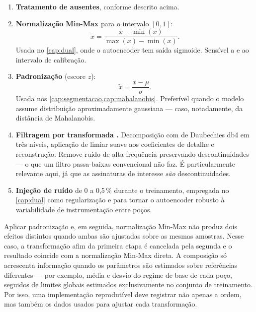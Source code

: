 \begin{enumerate}[leftmargin=*,itemsep=0.45em]

\item \textbf{Tratamento de ausentes}, conforme descrito acima.

\item \textbf{Normalização Min-Max} para o intervalo $[0,1]$:
\[
  \tilde{x} = \frac{x - \min(x)}{\max(x) - \min(x)}.
\]
Usada no \cref{cap:dual}, onde o autoencoder tem saída sigmoide. Sensível a
 e ao intervalo de calibração.

\item \textbf{Padronização} (escore $z$):
\[
  \tilde{x} = \frac{x - \mu}{\sigma}.
\]
Usada nos \cref{cap:segmentacao,cap:mahalanobis}. Preferível quando o modelo assume
distribuição aproximadamente gaussiana --- caso, notadamente, da distância de
Mahalanobis.

\item \textbf{Filtragem por transformada .} Decomposição com 
de Daubechies db4 em três níveis, aplicação de limiar suave aos coeficientes de detalhe
e reconstrução. Remove ruído de alta frequência preservando descontinuidades --- o que
um filtro passa-baixas convencional não faz. É particularmente relevante aqui, já que
as assinaturas de interesse \emph{são} descontinuidades.

\item \textbf{Injeção de ruído} de 0 a 0,5\,\% durante o treinamento, empregada no
\cref{cap:dual} como regularização e para tornar o autoencoder robusto à variabilidade
de instrumentação entre poços.

\end{enumerate}

\begin{destaque}
Aplicar padronização e, em seguida, normalização Min-Max não produz dois efeitos
distintos quando ambas são ajustadas sobre as mesmas amostras. Nesse caso, a
transformação afim da primeira etapa é cancelada pela segunda e o resultado coincide
com a normalização Min-Max direta. A composição só acrescenta informação quando os
parâmetros são estimados sobre referências diferentes --- por exemplo, média e desvio
do regime de base de cada poço, seguidos de limites globais estimados exclusivamente no
conjunto de treinamento. Por isso, uma implementação reprodutível deve registrar não
apenas a ordem, mas também os dados usados para ajustar cada transformação.
\end{destaque}


